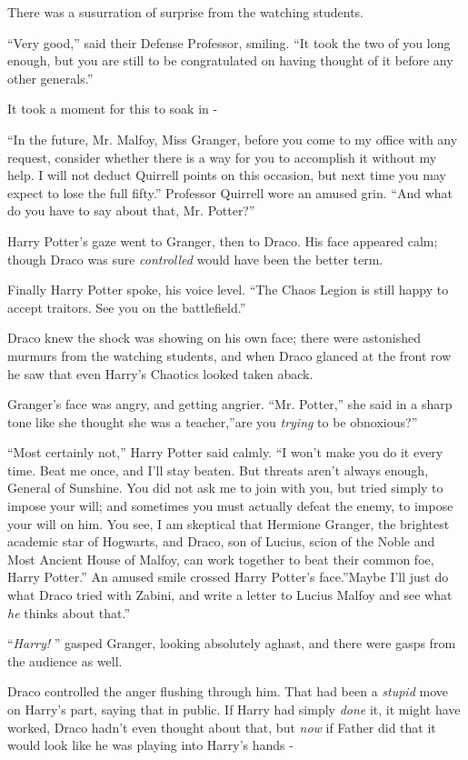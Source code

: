 There was a susurration of surprise from the watching students.

``Very good,'' said their Defense Professor, smiling. ``It took the two
of you long enough, but you are still to be congratulated on having
thought of it before any other generals.''

It took a moment for this to soak in -

``In the future, Mr. Malfoy, Miss Granger, before you come to my office
with any request, consider whether there is a way for you to accomplish
it without my help. I will not deduct Quirrell points on this occasion,
but next time you may expect to lose the full fifty.'' Professor
Quirrell wore an amused grin. ``And what do you have to say about that,
Mr. Potter?''

Harry Potter's gaze went to Granger, then to Draco. His face appeared
calm; though Draco was sure \emph{controlled} would have been the better
term.

Finally Harry Potter spoke, his voice level. ``The Chaos Legion is still
happy to accept traitors. See you on the battlefield.''

Draco knew the shock was showing on his own face; there were astonished
murmurs from the watching students, and when Draco glanced at the front
row he saw that even Harry's Chaotics looked taken aback.

Granger's face was angry, and getting angrier. ``Mr. Potter,'' she said
in a sharp tone like she thought she was a teacher,''are you
\emph{trying} to be obnoxious?''

``Most certainly not,'' Harry Potter said calmly. ``I won't make you do
it every time. Beat me once, and I'll stay beaten. But threats aren't
always enough, General of Sunshine. You did not ask me to join with you,
but tried simply to impose your will; and sometimes you must actually
defeat the enemy, to impose your will on him. You see, I am skeptical
that Hermione Granger, the brightest academic star of Hogwarts, and
Draco, son of Lucius, scion of the Noble and Most Ancient House of
Malfoy, can work together to beat their common foe, Harry Potter.'' An
amused smile crossed Harry Potter's face.''Maybe I'll just do what Draco
tried with Zabini, and write a letter to Lucius Malfoy and see what
\emph{he} thinks about that.''

``\emph{Harry!} '' gasped Granger, looking absolutely aghast, and there
were gasps from the audience as well.

Draco controlled the anger flushing through him. That had been a
\emph{stupid} move on Harry's part, saying that in public. If Harry had
simply \emph{done} it, it might have worked, Draco hadn't even thought
about that, but \emph{now} if Father did that it would look like he was
playing into Harry's hands -

